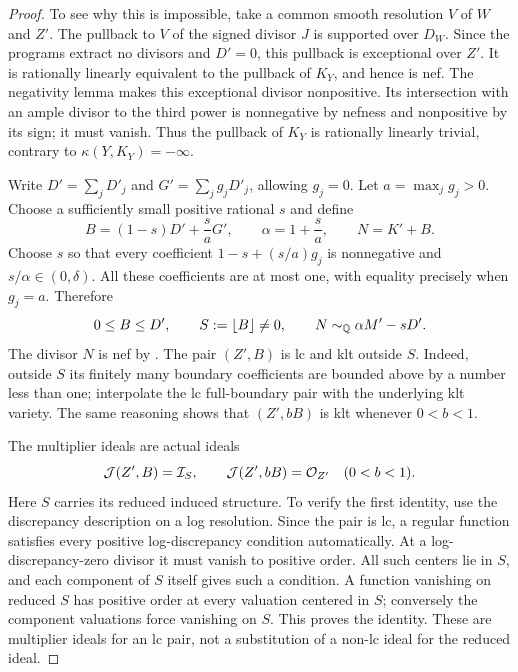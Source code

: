 \begin{proof}
To see why this is impossible, take a common smooth resolution $V$
of $W$ and $Z'$. The pullback to $V$ of the signed divisor $J$ is
supported over $D_W$. Since the programs extract no divisors and
$D'=0$, this pullback is exceptional over $Z'$. It is rationally
linearly equivalent to the pullback of $K_Y$, and hence is nef.
The negativity lemma makes this exceptional divisor nonpositive.
Its intersection with an ample divisor to the third power is
nonnegative by nefness and nonpositive by its sign; it must vanish.
Thus the pullback of $K_Y$ is rationally linearly trivial, contrary
to $\kappa(Y,K_Y)=-\infty$.

Write $D'=\sum_j D'_j$ and $G'=\sum_j g_jD'_j$, allowing $g_j=0$.
Let $a=\max_j g_j>0$. Choose a sufficiently small positive rational
$s$ and define
\begin{equation}
\label{eq:signed-boundary-wall}
 B=(1-s)D'+\frac{s}{a}G',\qquad
 \alpha=1+\frac{s}{a},\qquad N=K'+B.
\end{equation}
Choose $s$ so that every coefficient $1-s+(s/a)g_j$ is nonnegative
and $s/\alpha\in(0,\delta)$. All these coefficients are at most one,
with equality precisely when $g_j=a$. Therefore
\[
 0\leq B\leq D',\qquad S:=\lfloor B\rfloor\ne0,
 \qquad N\sim_{\mathbb Q}\alpha M'-sD'.
\]
The divisor $N$ is nef by . The pair
$(Z',B)$ is lc and klt outside $S$. Indeed, outside $S$ its finitely
many boundary coefficients are bounded above by a number less than
one; interpolate the lc full-boundary pair with the underlying klt
variety. The same reasoning shows that $(Z',bB)$ is klt whenever
$0<b<1$.

The multiplier ideals are actual ideals
\begin{equation}
\label{eq:signed-multiplier-ideals}
 \mathcal J(Z',B)=\mathcal I_S,\qquad
 \mathcal J(Z',bB)=\mathcal O_{Z'}\quad(0<b<1).
\end{equation}
Here $S$ carries its reduced induced structure. To verify the first
identity, use the discrepancy description on a log resolution.
Since the pair is lc, a regular function satisfies every positive
log-discrepancy condition automatically. At a log-discrepancy-zero
divisor it must vanish to positive order. All such centers lie in
$S$, and each component of $S$ itself gives such a condition. A
function vanishing on reduced $S$ has positive order at every
valuation centered in $S$; conversely the component valuations
force vanishing on $S$. This proves the identity. These are
multiplier ideals for an lc pair, not a substitution of a non-lc
ideal for the reduced ideal.


\end{proof}
